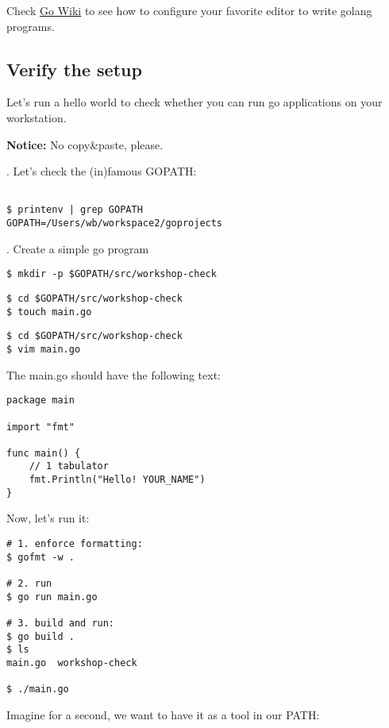 \documentclass[11pt, letterpaper]{article}
\begin{document}
Check \href{https://github.com/golang/go/wiki/IDEsAndTextEditorPlugins}{Go Wiki} to see how to configure your favorite editor to write golang programs.

\subsection{Verify the setup}
Let's run a hello world to check whether you can run go applications on your workstation.

\bigskip
\textbf{Notice:} No copy\&paste, please.

. Let's check the (in)famous GOPATH:

\begin{verbatim}

$ printenv | grep GOPATH
GOPATH=/Users/wb/workspace2/goprojects
\end{verbatim}

. Create a simple go program

\begin{verbatim}
$ mkdir -p $GOPATH/src/workshop-check
\end{verbatim}

\begin{verbatim}
$ cd $GOPATH/src/workshop-check
$ touch main.go
\end{verbatim}

\begin{verbatim}
$ cd $GOPATH/src/workshop-check
$ vim main.go
\end{verbatim}

The main.go should have the following text:

\begin{verbatim}
package main

import "fmt"

func main() {
    // 1 tabulator
    fmt.Println("Hello! YOUR_NAME")
}
\end{verbatim}

Now, let's run it:

\begin{verbatim}
# 1. enforce formatting:
$ gofmt -w .

# 2. run
$ go run main.go

# 3. build and run:
$ go build .
$ ls
main.go  workshop-check

$ ./main.go
\end{verbatim}

Imagine for a second, we want to have it as a tool in our PATH: 
\end{document}
